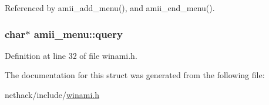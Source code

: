 Referenced by amii\+\_\+add\+\_\+menu(), and amii\+\_\+end\+\_\+menu().

\hypertarget{structamii__menu_a775d836d091d25502cd864c8ff76a2bd}{
\subsubsection[{query}]{ char$\ast$ amii\+\_\+menu\+::query}}\label{structamii__menu_a775d836d091d25502cd864c8ff76a2bd}


Definition at line 32 of file winami.\+h.



The documentation for this struct was generated from the following file\+:\begin{DoxyCompactItemize}
\item 
nethack/include/\hyperlink{winami_8h}{winami.\+h}\end{DoxyCompactItemize}
